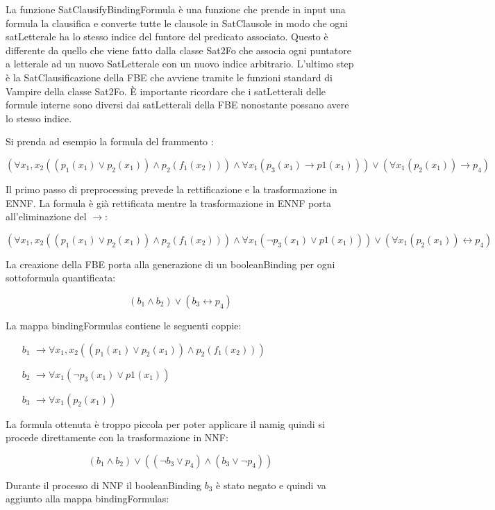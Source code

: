 \documentclass[./main.tex]{subfiles}
\begin{document}
La funzione SatClausifyBindingFormula è una funzione che prende in input una formula
la clausifica e converte tutte le clausole in SatClausole in modo che ogni satLetterale ha lo stesso indice del funtore del predicato associato.
Questo è differente da quello che viene fatto dalla classe Sat2Fo che associa ogni puntatore a letterale ad un nuovo SatLetterale con un nuovo indice arbitrario.
L'ultimo step è la SatClausificazione della FBE che avviene tramite le funzioni standard di Vampire della classe Sat2Fo.
È importante ricordare che i satLetterali delle formule interne sono diversi dai satLetterali della FBE nonostante possano avere
lo stesso indice.

Si prenda ad esempio la formula del frammento \cb:

$$ (\forall x_1, x_2 ((p_1(x_1) \lor p_2(x_1)) \land p_2(f_1(x_2))) 
\land  \forall x_1 (p_3(x_1) \rightarrow p1(x_1)))  
\lor (\forall x_1(p_2(x_1)) \rightarrow p_4)
$$

Il primo passo di preprocessing prevede la rettificazione e la trasformazione in ENNF.
La formula è già rettificata mentre la trasformazione in ENNF porta all'eliminazione del $\rightarrow$:

$$ (\forall x_1, x_2 ((p_1(x_1) \lor p_2(x_1)) \land p_2(f_1(x_2))) 
\land  \forall x_1 (\lnot p_3(x_1) \lor p1(x_1)))  
\lor (\forall x_1(p_2(x_1)) \leftrightarrow p_4)
$$

La creazione della FBE porta alla generazione di un booleanBinding per ogni sottoformula quantificata:

$$ (b_1 
\land  b_2)  
\lor (b_3 \leftrightarrow p_4)
$$

La mappa bindingFormulas contiene le seguenti coppie:

\begin{itemize}
    \item [$b_1$] $\rightarrow \forall x_1, x_2 ((p_1(x_1) \lor p_2(x_1)) \land p_2(f_1(x_2))) $
    \item [$b_2$] $\rightarrow \forall x_1 (\lnot p_3(x_1) \lor p1(x_1))$
    \item [$b_3$] $\rightarrow \forall x_1(p_2(x_1))$
\end{itemize}

La formula ottenuta è troppo piccola per poter applicare il namig
quindi si procede direttamente con la trasformazione in NNF:

$$ (b_1 
\land  b_2)  
\lor ((\lnot b_3 \lor p_4) \land (b_3 \lor \lnot p_4))
$$

Durante il processo di NNF il booleanBinding $b_3$ è stato negato e quindi va aggiunto alla mappa bindingFormulas:
\end{document}

